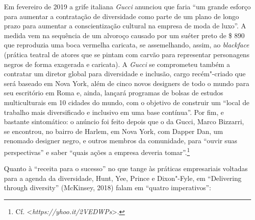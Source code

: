 Em fevereiro de 2019 a grife italiana \emph{Gucci} anunciou que faria
``um grande esforço para aumentar a contratação de diversidade como
parte de um plano de longo prazo para aumentar a conscientização
cultural na empresa de moda de luxo''. A medida vem na sequência de um
alvoroço causado por um suéter preto de \$ 890 que reproduzia uma boca
vermelha caricata, se assemelhando, assim, ao \emph{blackface} (prática
teatral de atores que se pintam com carvão para representar personagens
negros de forma exagerada e caricata). A \emph{Gucci} se comprometeu
também a contratar um diretor global para diversidade e inclusão, cargo
recém"-criado que será baseado em Nova York, além de cinco novos
designers de todo o mundo para seu escritório em Roma e, ainda, lançará
programas de bolsas de estudos multiculturais em 10 cidades do mundo,
com o objetivo de construir um ``local de trabalho mais diversificado e
inclusivo em uma base contínua''. Por fim, e bastante sintomático: o
anúncio foi feito depois que o  da Gucci, Marco Bizzarri, se
encontrou, no bairro de Harlem, em Nova York, com Dapper Dan, um
renomado designer negro, e outros membros da comunidade, para ``ouvir
suas perspectivas'' e saber ``quais ações a empresa deveria
tomar''.\footnote{Cf.
  \textless{}\emph{https://yhoo.it/2VEDWPs}\textgreater{}.}

Quanto à ``receita para o sucesso'' no que tange às práticas
empresariais voltadas para a agenda da diversidade, Hunt, Yee, Prince e
Dixon"-Fyle, em ``Delivering through diversity'' (McKinsey, 2018) falam
em ``quatro imperativos'':

